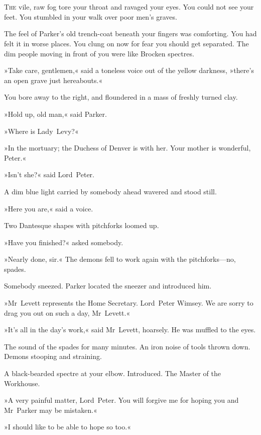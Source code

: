\chapter[Chapter \thechapter]{}
\lettrine[lines=4]{T}{he} vile, raw fog tore your throat and ravaged your eyes. You could not see your feet. You stumbled in your walk over poor men's graves.

\zz
The feel of Parker's old trench-coat beneath your fingers was comforting. You had felt it in worse places. You clung on now for fear you should get separated. The dim people moving in front of you were like Brocken spectres.

»Take care, gentlemen,« said a toneless voice out of the yellow darkness, »there's an open grave just hereabouts.«

You bore away to the right, and floundered in a mass of freshly turned clay.

»Hold up, old man,« said Parker.

»Where is Lady~Levy?«

»In the mortuary; the Duchess of Denver is with her. Your mother is wonderful, Peter.«

»Isn't she?« said Lord~Peter.

A dim blue light carried by somebody ahead wavered and stood still.

»Here you are,« said a voice.

Two Dantesque shapes with pitchforks loomed up.

»Have you finished?« asked somebody.

»Nearly done, sir.« The demons fell to work again with the pitchforks—no, spades.

Somebody sneezed. Parker located the sneezer and introduced him.

»Mr~Levett represents the Home Secretary. Lord~Peter Wimsey. We are sorry to drag you out on such a day, Mr~Levett.«

»It's all in the day's work,« said Mr~Levett, hoarsely. He was muffled to the eyes.

The sound of the spades for many minutes. An iron noise of tools thrown down. Demons stooping and straining.

A black-bearded spectre at your elbow. Introduced. The Master of the Workhouse.

»A very painful matter, Lord~Peter. You will forgive me for hoping you and Mr~Parker may be mistaken.«

»I should like to be able to hope so too.«

